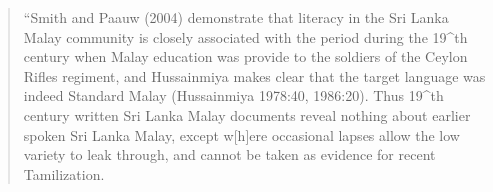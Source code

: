 \begin{quotation}
    ``Smith and Paauw (2004) \nocite{SmithEtAl2004}  demonstrate that literacy in the Sri Lanka Malay community is closely associated with the period during the 19^{th} century when Malay education was provide to the soldiers of the Ceylon Rifles regiment, and Hussainmiya makes clear that the target language was indeed Standard Malay (Hussainmiya 1978:40, 1986:20)\nocite{Hussainmiya1978manuscripts, Hussainmiya1986}. Thus 19^{th} century written Sri Lanka Malay documents reveal nothing about earlier spoken Sri Lanka Malay, except w[h]ere occasional lapses allow the low variety to leak through, and cannot be taken as evidence for recent Tamilization. \citet[18]{SmithRH}
\end{quotation}



